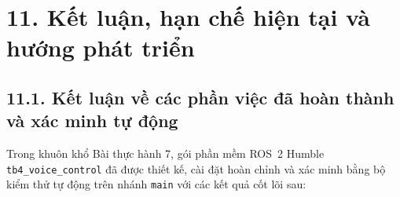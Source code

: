 \section*{11. Kết luận, hạn chế hiện tại và hướng phát triển}

\subsection*{11.1. Kết luận về các phần việc đã hoàn thành và xác minh tự động}

Trong khuôn khổ Bài thực hành 7, gói phần mềm ROS~2 Humble \texttt{tb4\_voice\_control} đã được thiết kế, cài đặt hoàn chỉnh và xác minh bằng bộ kiểm thử tự động trên nhánh \texttt{main} với các kết quả cốt lõi sau:
